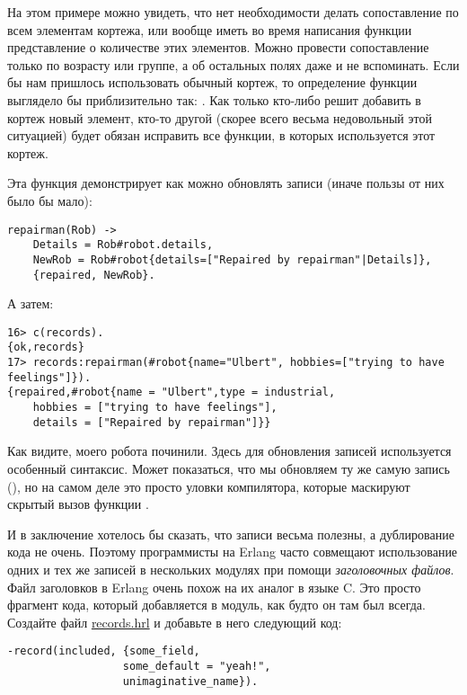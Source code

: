 На этом примере можно увидеть, что нет необходимости делать сопоставление по всем элементам кортежа, или вообще иметь во время написания функции представление о количестве этих элементов.
Можно провести сопоставление только по возрасту или группе, а об остальных полях даже и не вспоминать.
Если бы нам пришлось использовать обычный кортеж, то определение функции выглядело бы приблизительно так: .
Как только кто\--либо решит добавить в кортеж новый элемент, кто\--то другой (скорее всего весьма недовольный этой ситуацией) будет обязан исправить все функции, в которых используется этот кортеж.

Эта функция демонстрирует как можно обновлять записи (иначе пользы от них было бы мало):
\begin{lstlisting}[style=erlang]
repairman(Rob) ->
    Details = Rob#robot.details,
    NewRob = Rob#robot{details=["Repaired by repairman"|Details]},
    {repaired, NewRob}.
\end{lstlisting}

А затем:
\begin{lstlisting}[style=erlang]
16> c(records).
{ok,records}
17> records:repairman(#robot{name="Ulbert", hobbies=["trying to have feelings"]}).
{repaired,#robot{name = "Ulbert",type = industrial,
    hobbies = ["trying to have feelings"],
    details = ["Repaired by repairman"]}}
\end{lstlisting}

Как видите, моего робота починили.
Здесь для обновления записей используется особенный синтаксис.
Может показаться, что мы обновляем ту же самую запись (), но на самом деле это просто уловки компилятора, которые маскируют скрытый вызов функции .

И в заключение хотелось бы сказать, что записи весьма полезны, а дублирование кода не очень.
Поэтому программисты на Erlang часто совмещают использование одних и тех же записей в нескольких модулях при помощи \emph{заголовочных файлов}.
Файл заголовков в Erlang очень похож на их аналог в языке C.
Это просто фрагмент кода, который добавляется в модуль, как будто он там был всегда.
Создайте файл \href{http://learnyousomeerlang.com/static/erlang/records.hrl}{records.hrl} и добавьте в него следующий код:
\begin{lstlisting}[style=erlang]
%% this is a .hrl (header) file.
-record(included, {some_field,
                  some_default = "yeah!",
                  unimaginative_name}).
\end{lstlisting}

